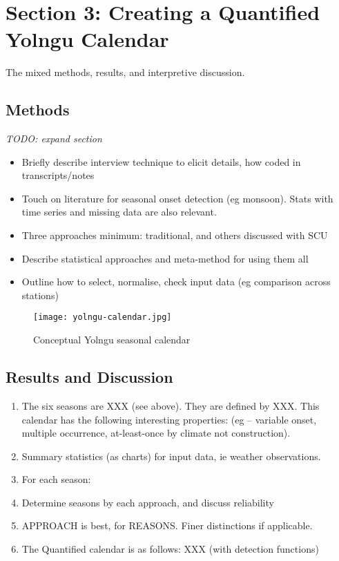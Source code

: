 \chapter{Section 3:  Creating a Quantified Yolngu Calendar}
The mixed methods, results, and interpretive discussion.

\section{Methods}

\emph{TODO:  expand section}
\begin{itemize}
\item Briefly describe interview technique to elicit details, how coded in transcripts/notes
\item Touch on literature for seasonal onset detection (eg monsoon).
        Stats with time series and missing data are also relevant.
\item Three approaches minimum:  traditional, and others discussed with SCU
\item Describe statistical approaches and meta-method for using them all
\item Outline how to select, normalise, check input data (eg comparison across stations)
\end{itemize}

\begin{figure}[h]
    \centering
    \texttt{[image: yolngu-calendar.jpg]}
    \caption{Conceptual Yolngu seasonal calendar \citep{davis1989}}
    \label{fig:yolngu-seasons}
\end{figure}

\section{Results and Discussion}

\begin{enumerate}
\item The six seasons are XXX (see above).  They are defined by XXX.
        This calendar has the following interesting properties:
        (eg – variable onset, multiple occurrence, at-least-once by climate not construction).
\item Summary statistics (as charts) for input data, ie weather observations.
\item For each season:
\item Determine seasons by each approach, and discuss reliability
\item APPROACH is best, for REASONS.  Finer distinctions if applicable.
\item The Quantified calendar is as follows:  XXX (with detection functions)
\end{enumerate}

